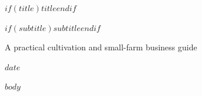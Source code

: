 \documentclass[11pt]{article}
\begin{document}
\begin{titlepage}
\centering
\vspace*{2.2cm}
{\Huge\bfseries $if(title)$$title$$endif$\par}
\vspace{0.7cm}
{\Large $if(subtitle)$$subtitle$$endif$\par}
\vfill
{\large A practical cultivation and small-farm business guide\par}
\vspace{0.45cm}
{\large $date$\par}
\end{titlepage}
\tableofcontents
\newpage
$body$
\end{document}
